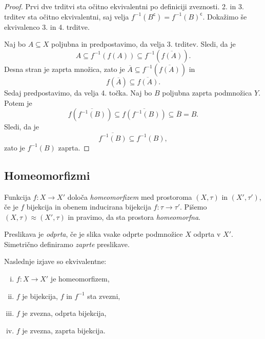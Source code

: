 \begin{proof}
Prvi dve trditvi sta očitno ekvivalentni po definiciji zveznosti.
2. in 3. trditev sta očitno ekvivalentni, saj velja
$f^{-1}(B^\mathsf{c}) = f^{-1}(B)^\mathsf{c}$. Dokažimo še
ekvivalenco 3. in 4. trditve.

Naj bo $A\subseteq X$ poljubna in predpostavimo, da velja 3.
trditev. Sledi, da je
\[
A \subseteq f^{-1}(f(A)) \subseteq f^{-1}(\overline{f(A)}).
\]
Desna stran je zaprta množica, zato je
$\overline{A} \subseteq f^{-1}(\overline{f(A)})$ in
\[
f(\overline{A}) \subseteq \overline{f(A)}.
\]
Sedaj predpostavimo, da velja 4. točka. Naj bo $B$ poljubna zaprta
podmnožica $Y$. Potem je
\[
f(\overline{f^{-1}(B)}) \subseteq \overline{f(f^{-1}(B))}
\subseteq \overline{B} = B.
\]
Sledi, da je
\[
\overline{f^{-1}(B)} \subseteq f^{-1}(B),
\]
zato je $f^{-1}(B)$ zaprta.
\end{proof}

\newpage

\subsection{Homeomorfizmi}


\begin{okvir}
\begin{definicija}
Funkcija $f \colon X \to X'$ določa
\emph{homeomorfizem}
med prostoroma $(X,\tau)$ in $(X',\tau')$, če je $f$
bijekcija in obenem inducirana bijekcija
$f \colon \tau \to \tau'$. Pišemo
$(X,\tau) \approx (X',\tau)$ in pravimo, da sta
prostora \emph{homeomorfna}.
\end{definicija}
\end{okvir}

\begin{definicija}
Preslikava je \emph{odprta}, če je
slika vsake odprte podmnožice $X$ odprta v $X'$. Simetrično
definiramo \emph{zaprte} preslikave.
\end{definicija}

\begin{trditev}
Naslednje izjave so ekvivalentne:

\begin{enumerate}[i)]
\item $f \colon X \to X'$ je homeomorfizem,
\item $f$ je bijekcija, $f$ in $f^{-1}$ sta zvezni,
\item $f$ je zvezna, odprta bijekcija,
\item $f$ je zvezna, zaprta bijekcija.
\end{enumerate}
\end{trditev}

